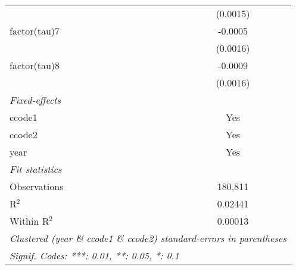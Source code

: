\begin{tabular}{lc}
                       & (0.0015)\\   
   factor(tau)7        & -0.0005\\   
                       & (0.0016)\\   
   factor(tau)8        & -0.0009\\   
                       & (0.0016)\\   
   \midrule
   \emph{Fixed-effects}\\
   ccode1              & Yes\\  
   ccode2              & Yes\\  
   year                & Yes\\  
   \midrule
   \emph{Fit statistics}\\
   Observations        & 180,811\\  
   R$^2$               & 0.02441\\  
   Within R$^2$        & 0.00013\\  
   \midrule \midrule
   \multicolumn{2}{l}{\emph{Clustered (year \& ccode1 \& ccode2) standard-errors in parentheses}}\\
   \multicolumn{2}{l}{\emph{Signif. Codes: ***: 0.01, **: 0.05, *: 0.1}}\\
\end{tabular}
\par\endgroup



